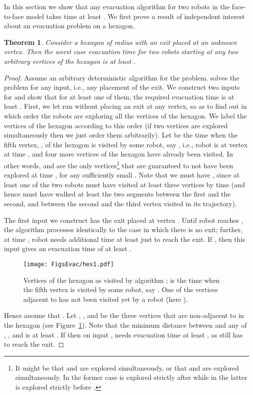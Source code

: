 \documentclass[
final
]{dmtcs-episciences}
\newcommand{\ff}{face-to-face }
\newtheorem{theorem}{Theorem}[section]
\theoremstyle{definition}
\begin{document}
In this section we show that any evacuation algorithm for
two robots in the \ff model takes time at least
. We first prove a result of independent interest about an evacuation problem on a hexagon. 
\begin{theorem}\label{thm:hexagon}
Consider a hexagon of radius  with an exit placed at an unknown vertex.
Then the worst case evacuation time for two robots starting at any two  arbitrary vertices of the hexagon 
is at least .
\end{theorem}
\begin{proof}
Assume an arbitrary deterministic algorithm  for the problem. 
 solves the problem for any input, i.e., any placement of the exit.
We construct two inputs for  and show that for at least one of them, the required evacuation time is at least .
First, we let  run without placing an exit at any vertex, so as to 
find out in which order the robots are exploring all the vertices
of the hexagon. We label the vertices of the hexagon according to this order (if two vertices are explored simultaneously then we just order them arbitrarily).
Let  be the time when the fifth vertex, , of the hexagon is visited by some robot, say , i.e., robot  is at vertex  at time , and four more vertices of the hexagon have already been visited. In other words,  and  are the only vertices\footnote{It might be that  and  are explored simultaneously, or that  and  are explored simultaneously. In the former case  is explored strictly after  while in the latter  is explored strictly before .} 
that are guaranteed to not have been explored at time , for any sufficiently small .
Note that we must have , since at least one of the two robots must have visited at least three vertices by time  (and hence must have walked at least the 
two segments between the first and the second, and between the second and the third vertex visited in its trajectory).
	
The first input  we construct has the exit placed at vertex . 
Until robot  reaches , the algorithm  
processes  identically to the case in which there is no exit; further, at time , robot  needs additional time at least  just to reach the exit.
If , then this input gives an evacuation time of at least . 

\begin{figure}[ht]
                \centering
                \texttt{[image: FigsEvac/hex1.pdf]}
                \caption{Vertices of the hexagon as visited by algorithm ;  is the time when the fifth vertex  is visited by some robot, say . One of the vertices adjacent to  has not been visited yet by a robot (here ).}
                \label{fig: hex}
\end{figure}
Hence assume that . Let , , and  be the three vertices that are non-adjacent to  in the hexagon (see Figure~\ref{fig: hex}).
Note that the minimum distance between  and any of , , and  is at least .
If  then on input ,  needs evacuation time at least , as  still has to 
reach the exit. 


\end{proof}
\end{document}
